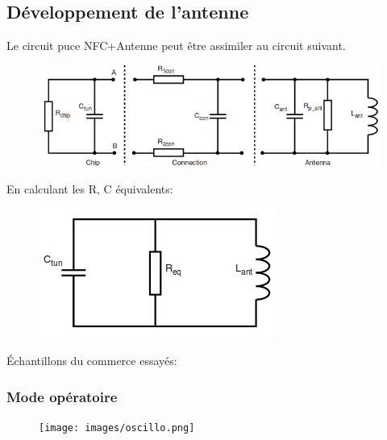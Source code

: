 \documentclass{beamer}
\begin{document}
\subsection{Développement de l'antenne}

\begin{frame}

Le circuit puce NFC+Antenne peut être assimiler au circuit suivant.
\begin{figure}
\centering
\includegraphics[scale=0.4]{images/withPARA.png}
\end{figure}

En calculant les R, C équivalents:
\begin{figure}
\centering
\includegraphics[scale=0.4]{images/circuiteq.png}
\end{figure}
\end{frame}


\begin{frame}

Échantillons du commerce essayés:
\begin{figure}
\center
\end{figure}

\end{frame}

\begin{frame}
\frametitle{Mode opératoire}
\begin{figure}
\centering
\texttt{[image: images/oscillo.png]}
\end{figure}
\end{frame}
\end{document}
